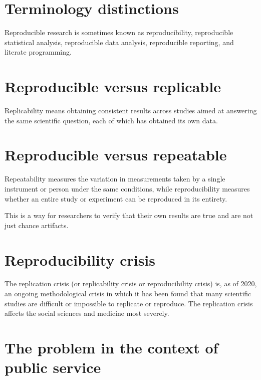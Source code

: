 \documentclass[
]{book}
\begin{document}
\hypertarget{terminology-distinctions}{%
\section{Terminology distinctions}\label{terminology-distinctions}}

Reproducible research is sometimes known as reproducibility, reproducible statistical analysis, reproducible data analysis, reproducible reporting, and literate programming.

\hypertarget{reproducible-versus-replicable}{%
\section{Reproducible versus replicable}\label{reproducible-versus-replicable}}

Replicability means obtaining consistent results across studies aimed at answering the same scientific question, each of which has obtained its own data.

\hypertarget{reproducible-versus-repeatable}{%
\section{Reproducible versus repeatable}\label{reproducible-versus-repeatable}}

Repeatability measures the variation in measurements taken by a single instrument or person under the same conditions, while reproducibility measures whether an entire study or experiment can be reproduced in its entirety.

This is a way for researchers to verify that their own results are true and are not just chance artifacts.

\hypertarget{reproducibility-crisis}{%
\section{Reproducibility crisis}\label{reproducibility-crisis}}

The replication crisis (or replicability crisis or reproducibility crisis) is, as of 2020, an ongoing methodological crisis in which it has been found that many scientific studies are difficult or impossible to replicate or reproduce. The replication crisis affects the social sciences and medicine most severely.

\hypertarget{the-problem-in-the-context-of-public-service}{%
\section{The problem in the context of public service}\label{the-problem-in-the-context-of-public-service}}
\end{document}
